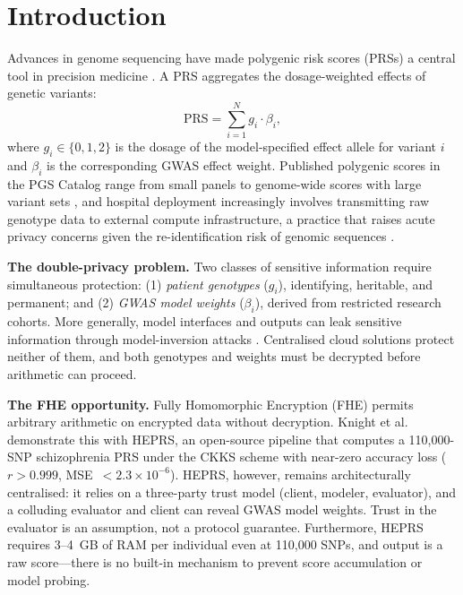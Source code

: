 \documentclass[10pt,twocolumn]{article}
\begin{document}
\section{Introduction}
\label{sec:intro}

Advances in genome sequencing have made polygenic risk scores (PRSs) a central tool
in precision medicine \citep{wray2021polygenic,inouye2018genomic}.  A PRS aggregates
the dosage-weighted effects of genetic variants:
\begin{equation}
  \mathrm{PRS} = \sum_{i=1}^{N} g_i \cdot \beta_i,
  \label{eq:prs}
\end{equation}
where $g_i \in \{0,1,2\}$ is the dosage of the model-specified effect allele for variant
$i$ and $\beta_i$ is the corresponding GWAS effect weight.  Published polygenic scores in the PGS Catalog range
from small panels to genome-wide scores with large variant sets \citep{lambert2019polygenic},
and hospital deployment increasingly involves
transmitting raw genotype data to external compute infrastructure, a practice that
raises acute privacy concerns given the re-identification risk of genomic sequences
\citep{gymrek2013,erlich2014}.

\textbf{The double-privacy problem.}
Two classes of sensitive information require simultaneous protection: (1)
\emph{patient genotypes} ($g_i$), identifying, heritable, and permanent; and
(2) \emph{GWAS model weights} ($\beta_i$), derived from restricted research cohorts.
More generally, model interfaces and outputs can leak sensitive information through
model-inversion attacks \citep{fredrikson2015modelinversion}.
Centralised cloud solutions protect neither of them, and both genotypes and weights must
be decrypted before arithmetic can proceed.

\textbf{The FHE opportunity.}
Fully Homomorphic Encryption (FHE) permits arbitrary arithmetic on encrypted data
without decryption.  Knight et al.\ \citep{knight2026heprs} demonstrate this with
HEPRS, an open-source pipeline that computes a 110,000-SNP schizophrenia PRS under
the CKKS scheme \citep{cheon2017ckks} with near-zero accuracy loss ($r > 0.999$,
MSE~$< 2.3 \times 10^{-6}$).  HEPRS, however, remains architecturally centralised:
it relies on a three-party trust model (client, modeler, evaluator), and a colluding
evaluator and client can reveal GWAS model weights.  Trust in the evaluator is an
assumption, not a protocol guarantee.  Furthermore, HEPRS requires 3--4~GB of RAM
per individual even at 110,000 SNPs, and output is a raw score---there is no built-in
mechanism to prevent score accumulation or model probing.
\end{document}
